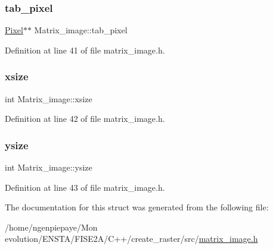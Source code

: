 \subsubsection{\texorpdfstring{tab\+\_\+pixel}{tab\_pixel}}
{\footnotesize\ttfamily \hyperlink{class_pixel}{Pixel}$\ast$$\ast$ Matrix\+\_\+image\+::tab\+\_\+pixel}



Definition at line 41 of file matrix\+\_\+image.\+h.

\mbox{\label{struct_matrix__image_ae7d959a24f238fc01c0be5a31b9ee85e}} 
\subsubsection{\texorpdfstring{xsize}{xsize}}
{\footnotesize\ttfamily int Matrix\+\_\+image\+::xsize}



Definition at line 42 of file matrix\+\_\+image.\+h.

\mbox{\label{struct_matrix__image_acde4c9c123ca46e60af3d4a0b18d8bfd}} 
\subsubsection{\texorpdfstring{ysize}{ysize}}
{\footnotesize\ttfamily int Matrix\+\_\+image\+::ysize}



Definition at line 43 of file matrix\+\_\+image.\+h.



The documentation for this struct was generated from the following file\+:\begin{DoxyCompactItemize}
\item 
/home/ngenpiepaye/\+Mon evolution/\+E\+N\+S\+T\+A/\+F\+I\+S\+E2\+A/\+C++/create\+\_\+raster/src/\hyperlink{matrix__image_8h}{matrix\+\_\+image.\+h}\end{DoxyCompactItemize}
